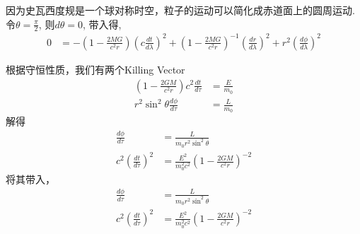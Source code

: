 因为史瓦西度规是一个球对称时空，粒子的运动可以简化成赤道面上的圆周运动. 令$\theta=\frac{\pi}{2}$, 则$d\theta=0$, 带入得,
\begin{equation}
    \begin{split}
        0&=-\left(1-\frac{2MG}{c^{2}r}\right)\left(c\frac{dt}{d\lambda}\right)^{2}+\left(1-\frac{2MG}{c^{2}r}\right)^{-1}\left(\frac{dr}{d\lambda}\right)^{2}+r^{2}\left(\frac{d\phi}{d\lambda}\right)^{2}
    \end{split}
\end{equation}

根据守恒性质，我们有两个Killing Vector
\begin{equation}
    \begin{split}
        \left(1-\frac{2GM}{c^{2}r}\right)c^{2}\frac{dt}{d\tau}&=\frac{E}{m_{0}}\\
        r^{2}\sin^{2}\theta\frac{d\phi}{d\tau}&=\frac{L}{m_{0}}
    \end{split}
\end{equation}
解得
\begin{equation}
    \begin{split}
        \frac{d\phi}{d\tau}&=\frac{L}{m_{0}r^{2}\sin^{2}\theta}\\
        c^{2}\left(\frac{dt}{d\tau}\right)^{2}&=\frac{E^{2}}{m_{0}^{2}c^{2}}\left(1-\frac{2GM}{c^{2}r}\right)^{-2}
    \end{split}
\end{equation}
将其带入，
\begin{equation}
    \begin{split}
        \frac{d\phi}{d\tau}&=\frac{L}{m_{0}r^{2}\sin^{2}\theta}\\
        c^{2}\left(\frac{dt}{d\tau}\right)^{2}&=\frac{E^{2}}{m_{0}^{2}c^{2}}\left(1-\frac{2GM}{c^{2}r}\right)^{-2}
    \end{split}
\end{equation}
